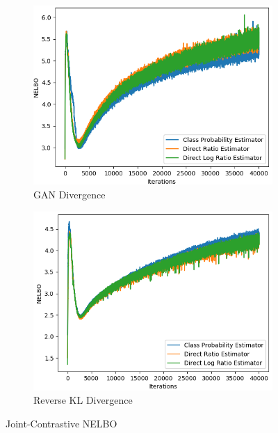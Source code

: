 \documentclass[honours,12pt]{unswthesis}
\numberwithin{equation}{section}
\theoremstyle{definition}
\begin{document}
\begin{figure}
\begin{subfigure}{0.49\textwidth}
\includegraphics[width=\linewidth]{nelbos/JCADVvsJCADVexpvsJCADVgudlog.png}
\caption{GAN Divergence}
\end{subfigure}
\begin{subfigure}{0.49\textwidth}
\includegraphics[width=\linewidth]{nelbos/JCKLDvsJCKLexpvsJCKLgudlog.png}
\caption{Reverse KL Divergence}
\end{subfigure}
\caption{Joint-Contrastive NELBO}
\end{figure}
\end{document}
